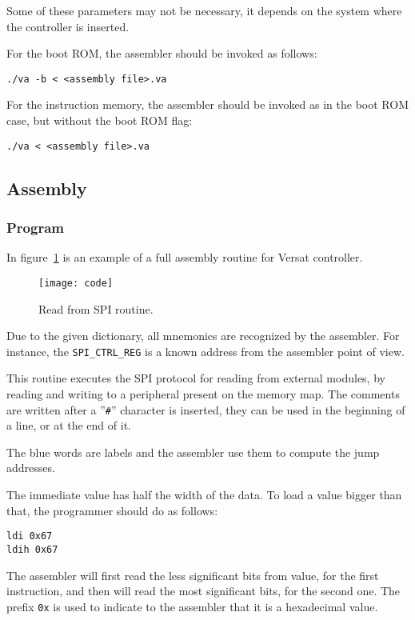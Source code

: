 Some of these parameters may not be necessary, it depends on the
system where the controller is inserted.

For the boot ROM, the assembler should be invoked as follows:
\begin{verbatim}
./va -b < <assembly file>.va
\end{verbatim}

For the instruction memory, the assembler should be invoked as in the
boot ROM case, but without the boot ROM flag:
\begin{verbatim}
./va < <assembly file>.va
\end{verbatim}

\newpage

\subsection{Assembly}

\subsubsection{Program}

In figure~\ref{fig:as_code} is an example of a full assembly routine
for Versat controller.

\begin{figure}[!htbp]
    \centerline{\texttt{[image: code]}}
    \vspace{0cm}\caption{Read from SPI routine.}
    \label{fig:as_code}
\end{figure}

Due to the given dictionary, all mnemonics are recognized by the
assembler. For instance, the {\tt SPI\_CTRL\_REG} is a known address
from the assembler point of view.

This routine executes the SPI protocol for reading from external
modules, by reading and writing to a peripheral present on the memory
map. The comments are written after a ''{\tt \#}'' character is
inserted, they can be used in the beginning of a line, or at the end
of it.

The blue words are labels and the assembler use them to compute the
jump addresses.

The immediate value has half the width of the data. To load a value
bigger than that, the programmer should do as follows:
\begin{verbatim}
ldi 0x67
ldih 0x67
\end{verbatim}

The assembler will first read the less significant bits from value,
for the first instruction, and then will read the most significant
bits, for the second one. The prefix {\tt 0x} is used to indicate to
the assembler that it is a hexadecimal value.

